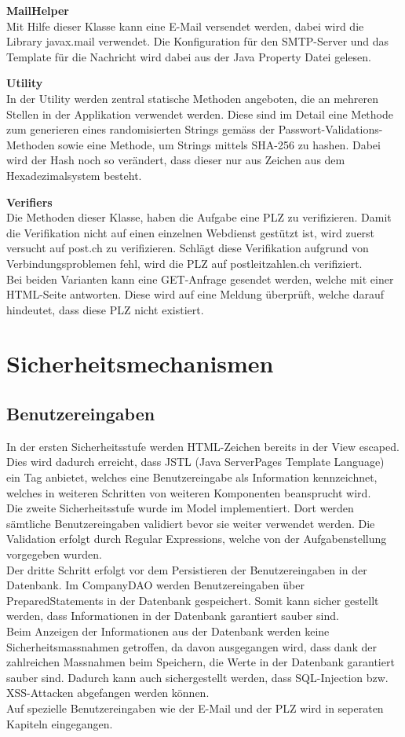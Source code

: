 \documentclass[12pt]{scrartcl}
\begin{document}
\textbf{MailHelper}\\
Mit Hilfe dieser Klasse kann eine E-Mail versendet werden, dabei wird die Library javax.mail verwendet. Die Konfiguration für den SMTP-Server und das Template für die Nachricht wird dabei aus der Java Property Datei gelesen.

\textbf{Utility}\\
In der Utility werden zentral statische Methoden angeboten, die an mehreren Stellen in der Applikation verwendet werden. Diese sind im Detail eine Methode zum generieren eines randomisierten Strings gemäss der Passwort-Validations-Methoden sowie eine Methode, um Strings mittels SHA-256 zu hashen. Dabei wird der Hash noch so verändert, dass dieser nur aus Zeichen aus dem Hexadezimalsystem besteht.

\textbf{Verifiers}\\
Die Methoden dieser Klasse, haben die Aufgabe eine PLZ zu verifizieren. Damit die Verifikation nicht auf einen einzelnen Webdienst gestützt ist, wird zuerst versucht auf post.ch zu verifizieren. Schlägt diese Verifikation aufgrund von Verbindungsproblemen fehl, wird die PLZ auf postleitzahlen.ch verifiziert.\\
Bei beiden Varianten kann eine GET-Anfrage gesendet werden, welche mit einer HTML-Seite antworten. Diese wird auf eine Meldung überprüft, welche darauf hindeutet, dass diese PLZ nicht existiert.

\section{Sicherheitsmechanismen}
\subsection{Benutzereingaben}
In der ersten Sicherheitsstufe werden HTML-Zeichen bereits in der View escaped. Dies wird dadurch erreicht, dass JSTL (Java ServerPages Template Language) ein Tag anbietet, welches eine Benutzereingabe als Information kennzeichnet, welches in weiteren Schritten von weiteren Komponenten beansprucht wird.\\
Die zweite Sicherheitsstufe wurde im Model implementiert. Dort werden sämtliche Benutzereingaben validiert bevor sie weiter verwendet werden. Die Validation erfolgt durch Regular Expressions, welche von der Aufgabenstellung vorgegeben wurden.\\
Der dritte Schritt erfolgt vor dem Persistieren der Benutzereingaben in der Datenbank. Im CompanyDAO werden Benutzereingaben über PreparedStatements in der Datenbank gespeichert. Somit kann sicher gestellt werden, dass Informationen in der Datenbank garantiert sauber sind.\\
Beim Anzeigen der Informationen aus der Datenbank werden keine Sicherheitsmassnahmen getroffen, da davon ausgegangen wird, dass dank der zahlreichen Massnahmen beim Speichern, die Werte in der Datenbank garantiert sauber sind. Dadurch kann auch sichergestellt werden, dass SQL-Injection bzw. XSS-Attacken abgefangen werden können.\\
Auf spezielle Benutzereingaben wie der E-Mail und der PLZ wird in seperaten Kapiteln eingegangen.
\end{document}
